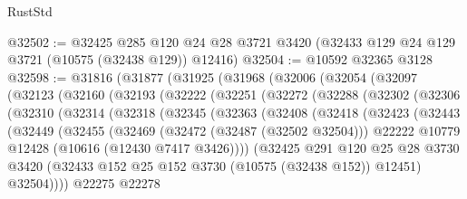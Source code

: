 \begin{lexlean}{RustStd}
\begin{coremodule}
@32502 := @32425
    @285
    @120
    @24
    @28
    @3721
    @3420
    (@32433 @129 @24 @129 @3721 (@10575 (@32438 @129)) @12416)
@32504 := @10592 @32365 @3128
@32598 := @31816
    (@31877
      (@31925
        (@31968
          (@32006
            (@32054
              (@32097
                (@32123
                  (@32160
                    (@32193
                      (@32222
                        (@32251
                          (@32272
                            (@32288
                              (@32302
                                (@32306
                                  (@32310
                                    (@32314
                                      (@32318
                                        (@32345
                                          (@32363
                                            (@32408
                                              (@32418
                                                (@32423
                                                  (@32443
                                                    (@32449
                                                      (@32455
                                                        (@32469
                                                          (@32472 (@32487 (@32502 @32504)))
                                                          @22222
                                                          @10779
                                                          @12428
                                                          (@10616 (@12430 @7417 @3426))))
                                                      (@32425
                                                        @291
                                                        @120
                                                        @25
                                                        @28
                                                        @3730
                                                        @3420
                                                        (@32433
                                                          @152
                                                          @25
                                                          @152
                                                          @3730
                                                          (@10575 (@32438 @152))
                                                          @12451)
                                                        @32504))))
                                                @22275
                                                @22278

\end{coremodule}
\end{lexlean}
